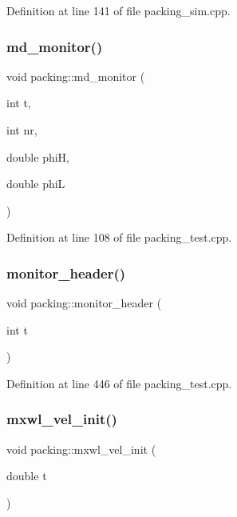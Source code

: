 Definition at line 141 of file packing\+\_\+sim.\+cpp.

\mbox{\label{classpacking_af2e5ff650c513fb8f69e0c1dd97a7ec7}} 
\subsubsection{\texorpdfstring{md\+\_\+monitor()}{md\_monitor()}}
{\footnotesize\ttfamily void packing\+::md\+\_\+monitor (\begin{DoxyParamCaption}\item[{int}]{t,  }\item[{int}]{nr,  }\item[{double}]{phiH,  }\item[{double}]{phiL }\end{DoxyParamCaption})}



Definition at line 108 of file packing\+\_\+test.\+cpp.

\mbox{\label{classpacking_a5567ef97dc24a25a5466dcbd8af82737}} 
\subsubsection{\texorpdfstring{monitor\+\_\+header()}{monitor\_header()}}
{\footnotesize\ttfamily void packing\+::monitor\+\_\+header (\begin{DoxyParamCaption}\item[{int}]{t }\end{DoxyParamCaption})}



Definition at line 446 of file packing\+\_\+test.\+cpp.

\mbox{\label{classpacking_ad096a61ae3cd07d3a85f0c865ec0af70}} 
\subsubsection{\texorpdfstring{mxwl\+\_\+vel\+\_\+init()}{mxwl\_vel\_init()}}
{\footnotesize\ttfamily void packing\+::mxwl\+\_\+vel\+\_\+init (\begin{DoxyParamCaption}\item[{double}]{t }\end{DoxyParamCaption})}



